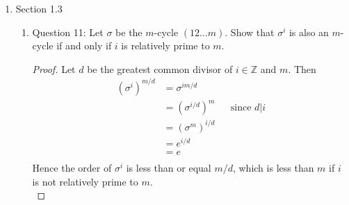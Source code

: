\documentclass{article}
\begin{document}
\begin{enumerate}
\begin{enumerate}
\begin{proof}
          Finally, we use these maps to get the generating rules of $G$
          from the generating rules of $D_{2n}$:
          \[\left \{
            \begin{tabular}{lll}
              $ord(s)$  & = $2$             & (says $ord(a)=2$) \\
              $ord(sr)$ & = $2$             & ($\because
              srsr=s(rs)r=s(sr^{-1})r=s^2=e$) \\
                        &                   & (says $ord(b)=2$) \\
              $r^n$     & = $e$             & (says $(ab)^n=1$) \\
            \end{tabular}
          \right .\ \]

        \end{proof}
    \end{enumerate}

  \item Section 1.3
    \begin{enumerate}
      \item Question 11: Let $\sigma$ be the $m$-cycle $(1 2 \ldots m)$.
        Show that $\sigma^i$ is also an $m$-cycle if and only if $i$ is
        relatively prime to $m$.
        \begin{proof}
          Let $d$ be the greatest common divisor of $i\in\mathbb{Z}$ and $m$.
          Then
          \begin{align*}
            (\sigma^{i})^{m/d}  &= \sigma^{im/d}      && \\
                                &= (\sigma^{i/d})^m   && \text{since $d|i$} \\
                                &= (\sigma^m)^{i/d}   && \\
                                &= e^{i/d}            && \\
                                &= e                  && \\
          \end{align*}
          Hence the order of $\sigma^i$ is less than or equal $m/d$, which
          is less than $m$ if $i$ is not relatively prime to $m$. \\


\end{proof}
\end{enumerate}
\end{enumerate}
\end{document}
